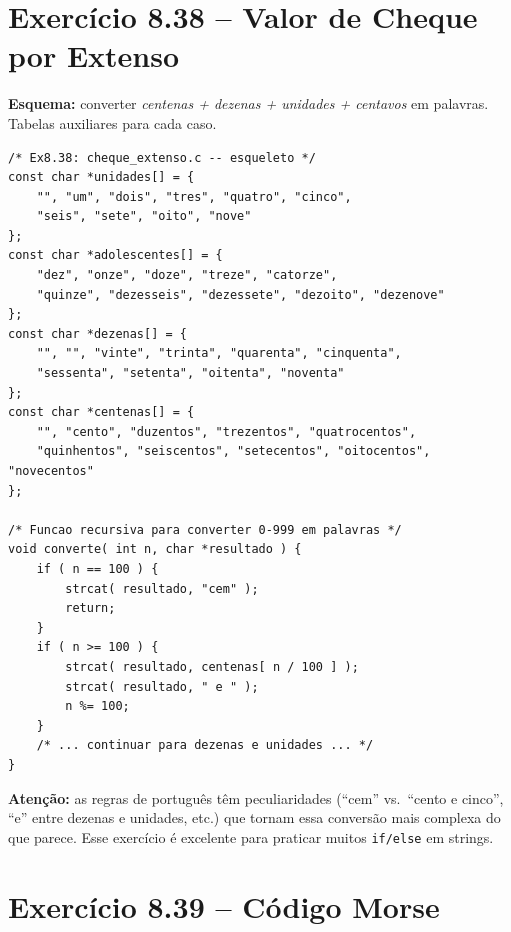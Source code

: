 \documentclass[12pt,a4paper]{article}
\begin{document}
\section{Exercício 8.38 -- Valor de Cheque por Extenso}

\begin{respostabox}
\textbf{Esquema:} converter \textit{centenas + dezenas + unidades + centavos}
em palavras. Tabelas auxiliares para cada caso.

\begin{lstlisting}
/* Ex8.38: cheque_extenso.c -- esqueleto */
const char *unidades[] = {
    "", "um", "dois", "tres", "quatro", "cinco",
    "seis", "sete", "oito", "nove"
};
const char *adolescentes[] = {
    "dez", "onze", "doze", "treze", "catorze",
    "quinze", "dezesseis", "dezessete", "dezoito", "dezenove"
};
const char *dezenas[] = {
    "", "", "vinte", "trinta", "quarenta", "cinquenta",
    "sessenta", "setenta", "oitenta", "noventa"
};
const char *centenas[] = {
    "", "cento", "duzentos", "trezentos", "quatrocentos",
    "quinhentos", "seiscentos", "setecentos", "oitocentos", "novecentos"
};

/* Funcao recursiva para converter 0-999 em palavras */
void converte( int n, char *resultado ) {
    if ( n == 100 ) {
        strcat( resultado, "cem" );
        return;
    }
    if ( n >= 100 ) {
        strcat( resultado, centenas[ n / 100 ] );
        strcat( resultado, " e " );
        n %= 100;
    }
    /* ... continuar para dezenas e unidades ... */
}
\end{lstlisting}

\textbf{Atenção:} as regras de português têm peculiaridades (``cem'' vs.\
``cento e cinco'', ``e'' entre dezenas e unidades, etc.) que tornam essa conversão
mais complexa do que parece. Esse exercício é excelente para praticar muitos
\texttt{if/else} em strings.
\end{respostabox}

\newpage

\section{Exercício 8.39 -- Código Morse}
\end{document}

